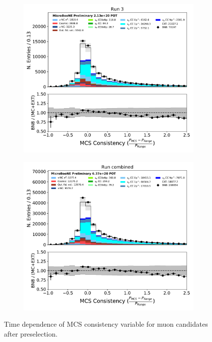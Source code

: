 \begin{figure}[hbt!]
\begin{center}
\begin{subfigure}[b]{0.35\textwidth}
    \end{subfigure}
    \begin{subfigure}[b]{0.35\textwidth}
        \centering
        \includegraphics[width=1.00\textwidth]{NuMuCCsel/Images/Ryan/Run3_nocrt/trk_p_quality_v_08052020_presel_samples_longest_noCRT_event_category.pdf}
    \end{subfigure} %
    \begin{subfigure}[b]{0.35\textwidth}
        \centering
        \includegraphics[width=1.00\textwidth]{NuMuCCsel/Images/Ryan/combined/trk_p_quality_v_08052020_presel_samples_longest_noCRT_event_category.pdf}
    \end{subfigure}
\caption{Time dependence of MCS consistency variable for muon candidates after preselection.}
\label{fig:NuMuCCsel:timedep:MCSquality}
\end{center}
\end{figure}

